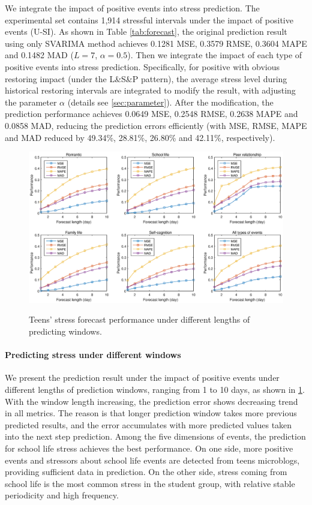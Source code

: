We integrate the impact of positive events into stress prediction.
The experimental set contains 1,914 stressful intervals under the impact of positive events (U-SI).
As shown in Table \ref{tab:forecast},
the original prediction result using only SVARIMA method
achieves 0.1281 MSE, 0.3579 RMSE, 0.3604 MAPE and 0.1482 MAD ($L = 7$, $\alpha = 0.5$).
Then we integrate the impact of each type of positive events into stress prediction.
Specifically, for positive with obvious restoring impact (under the L\&S\&P pattern),
the average stress level during historical restoring intervals are integrated to modify the result,
with adjusting the parameter $\alpha$ (details see \ref{sec:parameter}).
After the modification,
the prediction performance achieves 0.0649 MSE,	0.2548 RMSE, 0.2638 MAPE and 0.0858 MAD,
reducing the prediction errors efficiently (with MSE, RMSE, MAPE and MAD reduced by 49.34\%, 28.81\%, 26.80\% and 42.11\%, respectively).


\begin{figure}
\centering
\caption{Teens' stress forecast performance under different lengths of predicting windows.}
\includegraphics[width=\linewidth]{figs/predictWindow2.eps}
\label{fig:length}
\end{figure}


\paragraph{Predicting stress under different windows}
We present the prediction result under the impact of positive events under different lengths of prediction windows,
ranging from 1 to 10 days, as shown in \ref{fig:length}.
With the window length increasing,
the prediction error shows decreasing trend in all metrics.
The reason is that longer prediction window takes more previous predicted results,
and the error accumulates with more predicted values taken into the next step prediction.
Among the five dimensions of events,
the prediction for school life stress achieves the best performance.
On one side,
more positive events and stressors about school life events are detected from teens microblogs,
providing sufficient data in prediction.
On the other side,
stress coming from school life is the most common stress in the student group,
with relative stable periodicity and high frequency.


